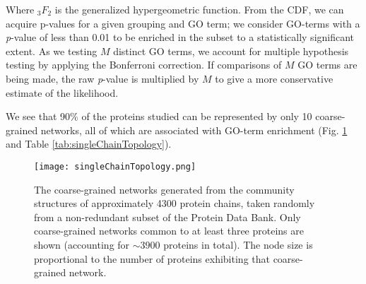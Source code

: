 \documentclass[a4paper,numbib, final, twoside, titelpage]{imaiai}%
\begin{document}
Where $_3F_2$ is the generalized hypergeometric function. From the CDF, we can acquire p-values for a given grouping and GO term; we consider GO-terms with a \textit{p}-value of less than 0.01 to be enriched in the subset to a statistically significant extent. As we testing $M$ distinct GO terms, we account for multiple hypothesis testing by applying the Bonferroni correction. If comparisons of $M$ GO terms are being made, the raw \textit{p}-value is multiplied by $M$ to give a more conservative estimate of the likelihood.

We see that 90\% of the proteins studied can be represented by only 10 coarse-grained networks, all of which are associated with GO-term enrichment (Fig. \ref{fig:singleChainTopology} and Table \ref{tab:singleChainTopology}).

\begin{figure}[hb!]
\centerline{\texttt{[image: singleChainTopology.png]}}
    \caption{The coarse-grained networks generated from the community structures of approximately 4300 protein chains, taken randomly from a non-redundant subset of the Protein Data Bank. Only coarse-grained networks common to at least three proteins are shown (accounting for $\sim 3900$ proteins in total). The node size is proportional to the number of proteins exhibiting that coarse-grained network. } \label{fig:singleChainTopology}



\end{figure}
\end{document}

